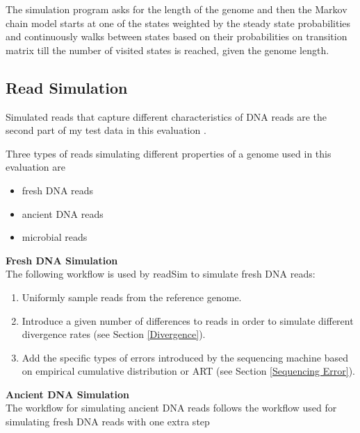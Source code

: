 \documentclass[11pt,a4paper]{report}
\begin{document}
The simulation program asks for the length of the genome and then the Markov chain 
model starts at one of the states weighted by the steady state probabilities and 
continuously walks between states based on their probabilities on transition matrix 
till the number of visited states is reached, given the genome length. 






\subsection{Read Simulation} \label{Read Simulation}

Simulated reads that capture different characteristics
of DNA reads are the second part of my test data in this
evaluation .

Three types of reads simulating different properties of
a genome used in this evaluation are

\begin{itemize}
	\item fresh DNA reads
	\item ancient DNA reads
	\item microbial reads
\end{itemize}

\textbf{Fresh DNA Simulation}\\

The following workflow is used by readSim to simulate fresh DNA
 reads:

\begin{enumerate}
 \item Uniformly sample reads from the reference genome.

 \item Introduce a given number of differences to 
 reads in order to simulate different divergence rates
 (see Section \ref{Divergence}).

 \item Add the specific types of errors introduced by the sequencing 
 machine based on empirical cumulative distribution or ART\cite{art} 
 (see Section \ref{Sequencing Error}).
\end{enumerate}


\textbf{Ancient DNA Simulation} \\

The workflow for simulating ancient DNA reads follows the
 workflow used for simulating fresh DNA reads with one extra step
\end{document}
